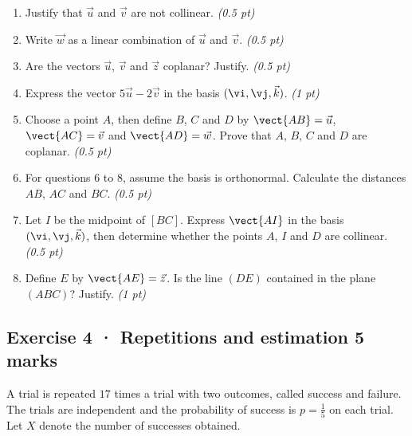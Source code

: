 \begin{enumerate}

\item Justify that $\vec u$ and $\vec v$ are not collinear. \hfill\textit{(0.5 pt)}

\item Write $\vec w$ as a linear combination of $\vec u$ and $\vec v$. \hfill\textit{(0.5 pt)}

\item Are the vectors $\vec u$, $\vec v$ and $\vec z$ coplanar? Justify. \hfill\textit{(0.5 pt)}

\item Express the vector $5\vec u-2\vec v$ in the basis $(\vi,\vj,\vec k)$. \hfill\textit{(1 pt)}

\item Choose a point $A$, then define $B$, $C$ and $D$ by $\vect{AB}=\vec u$, $\vect{AC}=\vec v$ and $\vect{AD}=\vec w$. Prove that $A$, $B$, $C$ and $D$ are coplanar. \hfill\textit{(0.5 pt)}

\item For questions 6 to 8, assume the basis is orthonormal. Calculate the distances $AB$, $AC$ and $BC$. \hfill\textit{(0.5 pt)}

\item Let $I$ be the midpoint of $[BC]$. Express $\vect{AI}$ in the basis $(\vi,\vj,\vec k)$, then determine whether the points $A$, $I$ and $D$ are collinear. \hfill\textit{(0.5 pt)}

\item Define $E$ by $\vect{AE}=\vec z$. Is the line $(DE)$ contained in the plane $(ABC)$? Justify. \hfill\textit{(1 pt)}

\end{enumerate}

\subsection*{Exercise 4 · Repetitions and estimation \hfill 5 marks}A trial is repeated $17$ times a trial with two outcomes, called success and failure. The trials are independent and the probability of success is $p=\frac{1}{5}$ on each trial. Let $X$ denote the number of successes obtained.

